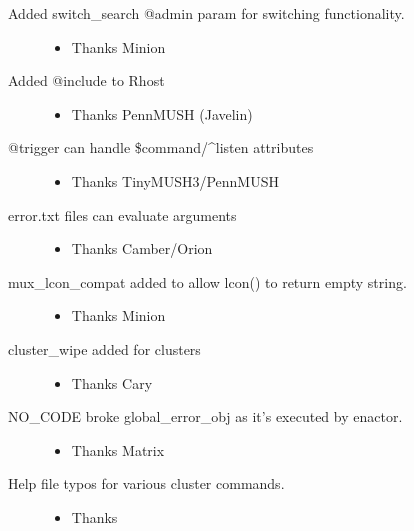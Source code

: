 \documentclass[letterpaper,10pt,english]{sphinxmanual}
\begin{document}
\begin{description}
\begin{itemize}
\end{itemize}

\item[{Added switch\_search @admin param for switching functionality.}] \leavevmode\begin{itemize}
\item {} 
\sphinxAtStartPar
Thanks Minion

\end{itemize}

\item[{Added @include to Rhost}] \leavevmode\begin{itemize}
\item {} 
\sphinxAtStartPar
Thanks PennMUSH (Javelin)

\end{itemize}

\item[{@trigger can handle \$command/\textasciicircum{}listen attributes}] \leavevmode\begin{itemize}
\item {} 
\sphinxAtStartPar
Thanks TinyMUSH3/PennMUSH

\end{itemize}

\item[{error.txt files can evaluate arguments}] \leavevmode\begin{itemize}
\item {} 
\sphinxAtStartPar
Thanks Camber/Orion

\end{itemize}

\item[{mux\_lcon\_compat added to allow lcon() to return empty string.}] \leavevmode\begin{itemize}
\item {} 
\sphinxAtStartPar
Thanks Minion

\end{itemize}

\item[{cluster\_wipe added for clusters}] \leavevmode\begin{itemize}
\item {} 
\sphinxAtStartPar
Thanks Cary

\end{itemize}

\item[{NO\_CODE broke global\_error\_obj as it’s executed by enactor.}] \leavevmode\begin{itemize}
\item {} 
\sphinxAtStartPar
Thanks Matrix

\end{itemize}

\item[{Help file typos for various cluster commands.}] \leavevmode\begin{itemize}
\item {} 
\sphinxAtStartPar
Thanks 

\end{itemize}

\end{description}
\end{document}
